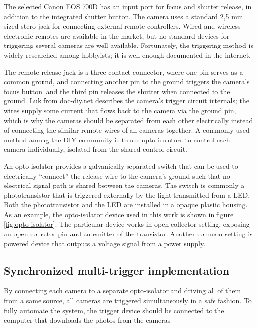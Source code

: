 The selected Canon EOS 700D has an input port for focus and shutter release, in addition to the integrated shutter button.
The camera uses a standard 2,5 mm sized stero jack for connecting external remote controllers.
Wired and wireless electronic remotes are available in the market, but no standard devices for triggering several cameras are well available. %
Fortunately, the triggering method is widely researched among hobbyists; it is well enough documented in the internet.

The remote release jack is a three-contact connector, where one pin serves as a common ground, and connecting another pin to the ground triggers the camera's focus button, and the third pin releases the shutter when connected to the ground.
Luk from doc-diy.net \cite{docdiy} describes the camera's trigger circuit internals; the wires supply some current that flows back to the camera via the ground pin, which is why the cameras should be separated from each other electrically instead of connecting the similar remote wires of all cameras together.
A commonly used method among the DIY community is to use opto-isolators to control each camera individually, isolated from the shared control circuit.

An opto-isolator provides a galvanically separated switch that can be used to electrically ``connect'' the release wire to the camera's ground such that no electrical signal path is shared between the cameras.
The switch is commonly a phototransistor that is triggered externally by the light transmitted from a LED.
Both the phototransistor and the LED are installed in a opaque plastic housing.
As an example, the opto-isolator device used in this work is shown in figure \ref{fig:opto-isolator}.
The particular device works in open collector setting, exposing an open collector pin and an emitter of the transistor.
Another common setting is powered device that outputs a voltage signal from a power supply.



\subsection{Synchronized multi-trigger implementation} %

By connecting each camera to a separate opto-isolator and driving all of them from a same source, all cameras are triggered simultaneously in a safe fashion.
To fully automate the system, the trigger device should be connected to the computer that downloads the photos from the cameras.

